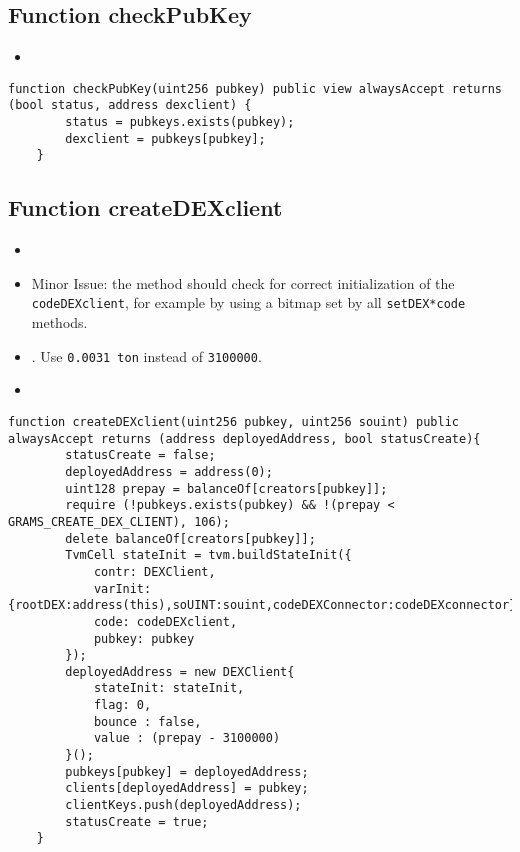 \subsection{Function checkPubKey}

\begin{itemize}
\item {}
\end{itemize}

\begin{lstlisting}[firstnumber=328]
	function checkPubKey(uint256 pubkey) public view alwaysAccept returns (bool status, address dexclient) {
		status = pubkeys.exists(pubkey);
		dexclient = pubkeys[pubkey];
	}
\end{lstlisting}

\subsection{Function createDEXclient}

\begin{itemize}
\item {}
\item Minor Issue: the method should check for correct initialization
  of the {\tt codeDEXclient}, for example by using a bitmap set by all
  {\tt setDEX*code} methods.
\item \issueUnits{}. Use {\tt 0.0031 ton} instead of {\tt 3100000}.
\item \issueError{}
\end{itemize}

\begin{lstlisting}[firstnumber=122]
	function createDEXclient(uint256 pubkey, uint256 souint) public alwaysAccept returns (address deployedAddress, bool statusCreate){
		statusCreate = false;
		deployedAddress = address(0);
		uint128 prepay = balanceOf[creators[pubkey]];
		require (!pubkeys.exists(pubkey) && !(prepay < GRAMS_CREATE_DEX_CLIENT), 106);
		delete balanceOf[creators[pubkey]];
		TvmCell stateInit = tvm.buildStateInit({
			contr: DEXClient,
			varInit: {rootDEX:address(this),soUINT:souint,codeDEXConnector:codeDEXconnector},
			code: codeDEXclient,
			pubkey: pubkey
		});
		deployedAddress = new DEXClient{
			stateInit: stateInit,
			flag: 0,
			bounce : false,
			value : (prepay - 3100000)
		}();
		pubkeys[pubkey] = deployedAddress;
		clients[deployedAddress] = pubkey;
		clientKeys.push(deployedAddress);
		statusCreate = true;
	}
\end{lstlisting}

